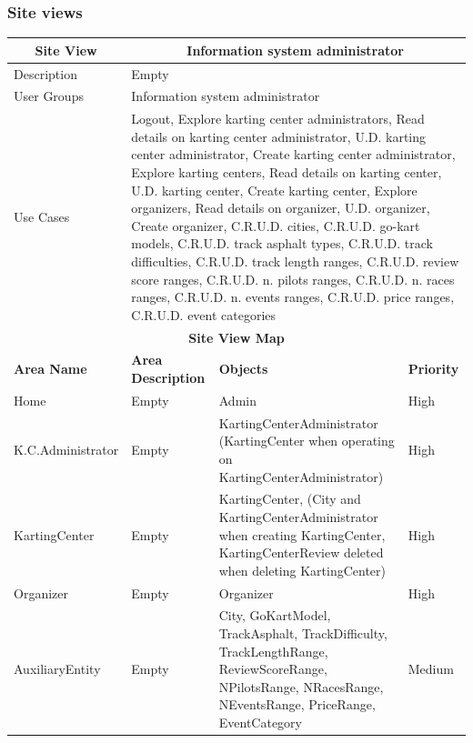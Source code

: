 \documentclass{beamer}
\begin{document}
\begin{frame}
    \frametitle{Site views}
    \begin{table}
        \centering
        \tiny
        \setlength{\tabcolsep}{1pt}
        \begin{tabular}{|m{2cm}|m{4cm}|m{3cm}|m{1cm}|}
        \hline
        \multicolumn{1}{|c|}{\textbf{Site View}} & \multicolumn{3}{c|}{\textbf{Information system administrator}} \\
        \hline
        Description & \multicolumn{3}{m{8cm}|}{Empty} \\
        \hline
        User Groups & \multicolumn{3}{m{8cm}|}{Information system administrator} \\
        \hline
        Use Cases & \multicolumn{3}{m{8cm}|}{Logout, Explore karting center administrators, 
        Read details on karting center administrator, U.D. karting center administrator, 
        Create karting center administrator, Explore karting centers, 
        Read details on karting center, U.D. karting center, Create karting center, 
        Explore organizers, Read details on organizer, U.D. organizer, Create organizer, 
        C.R.U.D. cities, C.R.U.D. go-kart models, C.R.U.D. track asphalt types, 
        C.R.U.D. track difficulties, C.R.U.D. track length ranges, C.R.U.D. review score ranges, 
        C.R.U.D. n. pilots ranges, C.R.U.D. n. races ranges, C.R.U.D. n. events ranges, 
        C.R.U.D. price ranges, C.R.U.D. event categories } \\
        \hline
        \multicolumn{4}{|c|}{\textbf{Site View Map}} \\
        \hline
        \textbf{Area Name} & \textbf{Area Description} & \textbf{Objects} & \textbf{Priority} \\
        \hline
        Home & Empty & Admin & High \\
        \hline
        K.C.Administrator & Empty & KartingCenterAdministrator (KartingCenter when operating
        on KartingCenterAdministrator) & High \\
        \hline
        KartingCenter & Empty & KartingCenter, (City and KartingCenterAdministrator when creating KartingCenter, KartingCenterReview 
        deleted when deleting KartingCenter) & High \\
        \hline
        Organizer & Empty & Organizer & High \\
        \hline
        AuxiliaryEntity & Empty & City, GoKartModel, 
        TrackAsphalt, TrackDifficulty, TrackLengthRange, ReviewScoreRange, NPilotsRange, NRacesRange, NEventsRange, PriceRange, EventCategory & Medium \\
        \hline
        \end{tabular}
    \end{table}
\end{frame}























\end{document}
